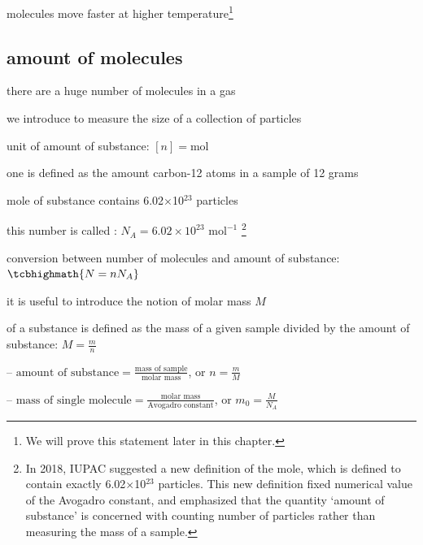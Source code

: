 molecules move faster at higher temperature\footnote{We will prove this statement later in this chapter.}


\subsection{amount of molecules}

there are a huge number of molecules in a gas

we introduce  to measure the size of a collection of particles

\cmt unit of amount of substance: $[n] = \text{mol}$

\begin{ilight}
	one  is defined as the amount carbon-12 atoms in a sample of 12 grams
\end{ilight}

 mole of substance contains 6.02$\times$10$^{23}$ particles

this number is called : $N_A = 6.02\times10^{23} \text{ mol}^{-1}$ \footnote{In 2018, IUPAC suggested a new definition of the mole, which is defined to contain exactly 6.02$\times$10$^{23}$ particles. This new definition fixed numerical value of the Avogadro constant, and emphasized that the quantity `amount of substance' is concerned with counting number of particles rather than measuring the mass of a sample.}

conversion between number of molecules and amount of substance: $\tcbhighmath{N=nN_A}$

\cmt it is useful to introduce the notion of molar mass $M$

\begin{ilight}
	 of a substance is defined as the mass of a given sample divided by the amount of substance: $M=\frac{m}{n}$
\end{ilight}

\begin{compactitem}
	\item[--] $\text{amount of substance} = \frac{\text{mass of sample}}{\text{molar mass}}$, or $n = \frac{m}{M}$
	
	\eqyskip
	
	\item[--] $\text{mass of single molecule} = \frac{\text{molar mass}}{\text{Avogadro constant}}$, or $m_0 = \frac{M}{N_A}$
\end{compactitem}

